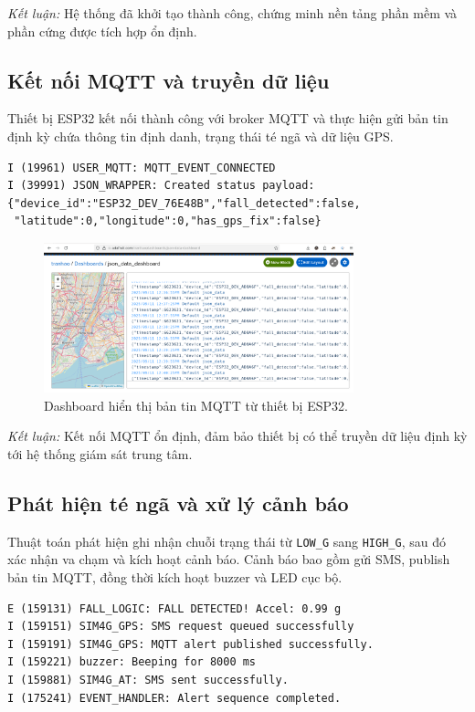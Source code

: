 \textit{Kết luận:} Hệ thống đã khởi tạo thành công, chứng minh nền tảng phần mềm và phần cứng được tích hợp ổn định.

\subsection{Kết nối MQTT và truyền dữ liệu}
Thiết bị ESP32 kết nối thành công với broker MQTT và thực hiện gửi bản tin định kỳ chứa thông tin định danh, trạng thái té ngã và dữ liệu GPS.  

\begin{verbatim}
I (19961) USER_MQTT: MQTT_EVENT_CONNECTED
I (39991) JSON_WRAPPER: Created status payload:
{"device_id":"ESP32_DEV_76E48B","fall_detected":false,
 "latitude":0,"longitude":0,"has_gps_fix":false}
\end{verbatim}

\begin{figure}[H]
    \centering
    \includegraphics[width=0.8\textwidth]{figures/json_data_dashboard.png}
    \caption{Dashboard hiển thị bản tin MQTT từ thiết bị ESP32.}
    \label{fig:mqtt_dashboard}
\end{figure}

\textit{Kết luận:} Kết nối MQTT ổn định, đảm bảo thiết bị có thể truyền dữ liệu định kỳ tới hệ thống giám sát trung tâm.

\subsection{Phát hiện té ngã và xử lý cảnh báo}
Thuật toán phát hiện ghi nhận chuỗi trạng thái từ \texttt{LOW\_G} sang \texttt{HIGH\_G}, sau đó xác nhận va chạm và kích hoạt cảnh báo.  
Cảnh báo bao gồm gửi SMS, publish bản tin MQTT, đồng thời kích hoạt buzzer và LED cục bộ.  

\begin{verbatim}
E (159131) FALL_LOGIC: FALL DETECTED! Accel: 0.99 g
I (159151) SIM4G_GPS: SMS request queued successfully
I (159191) SIM4G_GPS: MQTT alert published successfully.
I (159221) buzzer: Beeping for 8000 ms
I (159881) SIM4G_AT: SMS sent successfully.
I (175241) EVENT_HANDLER: Alert sequence completed.
\end{verbatim}

